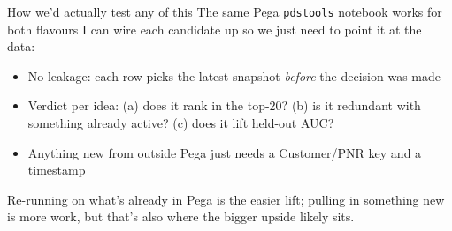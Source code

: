 \documentclass[aspectratio=169,11pt]{beamer}
\begin{document}
\begin{frame}{How we'd actually test any of this}
  \vspace{-0.3em}
  \footnotesize
  The same Pega \texttt{pdstools} notebook works for both flavours \textemdash{} I can wire each candidate up so we just need to point it at the data:
  \vspace{0.3em}

  \begin{center}
  \end{center}

  \vspace{0.3em}
  \scriptsize
  \begin{itemize}
    \setlength\itemsep{0.1em}
    \item No leakage: each row picks the latest snapshot \emph{before} the decision was made
    \item Verdict per idea: (a) does it rank in the top-20? (b) is it redundant with something already active? (c) does it lift held-out AUC?
    \item Anything new from outside Pega just needs a Customer/PNR key and a timestamp
  \end{itemize}
  \vspace{0.3em}
  \normalsize
  {\scriptsize\textcolor{accgray}{Re-running on what's already in Pega is the easier lift; pulling in something new is more work, but that's also where the bigger upside likely sits.}}
\end{frame}
\end{document}
